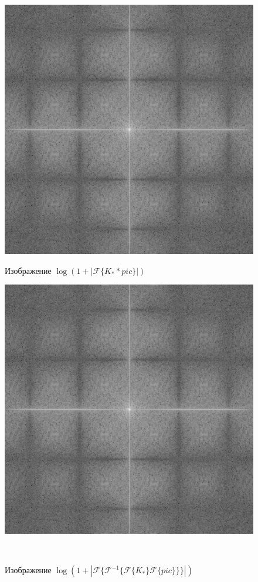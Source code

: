 \documentclass[a4paper]{article}
\begin{document}
\begin{figure}[H]
    \begin{minipage}{0.49\textwidth}
        \centering \includegraphics[width=\textwidth]{2/abs_fourier_log_norm_img_sharpen.png}
        \caption{Изображение $\log{(1+|\mathcal{F}\{K_**pic\}|)}$}
    \end{minipage}\hfill
    \begin{minipage}{0.49\textwidth}
        \centering \includegraphics[width=\textwidth]{2/abs_fourier_log_norm_img_sharpen1.png}
        \caption{Изображение $\log{(1+|\mathcal{F}\{\mathcal{F}^{-1}\{ \mathcal{F}\{K_*\}\mathcal{F}\{pic\}\}\}|)}$}
    \end{minipage}\\[1em]
\end{figure}\noindent\
\end{document}
